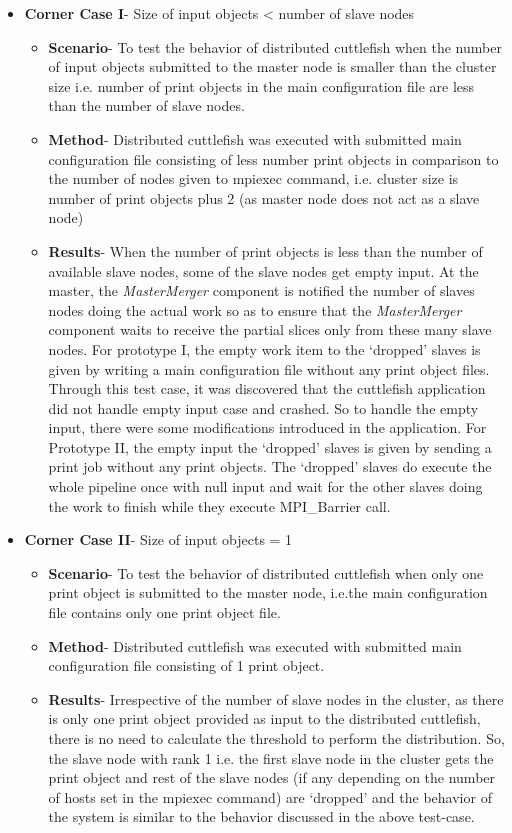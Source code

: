 \begin{enumerate}
\begin{itemize}
\item{\textbf{Corner Case I}- Size of input objects < number of slave nodes }
\begin{itemize}
\item{\textbf{Scenario}}- To test the behavior of distributed cuttlefish when the number of input objects submitted to the master node is smaller than the cluster size i.e. number of print objects in the main configuration file are less than the number of slave nodes.
\item{\textbf{Method}}- Distributed cuttlefish was executed with submitted main configuration file consisting of less number print objects in comparison to the number of nodes given to mpiexec command, i.e.  cluster size is number of print objects plus 2 (as master node does not act as a slave node)
\item{\textbf{Results}}- When the number of print objects is less than the number of available slave nodes, some of the slave nodes get empty input. At the master, the \textit{MasterMerger} component is notified the number of slaves nodes doing the actual work so as to ensure that the \textit{MasterMerger} component waits to receive the partial slices only from these many slave nodes. For prototype I, the empty work item to the {\lq}dropped{\rq} slaves is given by writing a main configuration file without any print object files. Through this test case, it was discovered that the cuttlefish application did not handle empty input case and crashed. So to handle the empty input, there were some modifications introduced in the application. For Prototype II, the empty input the {\lq}dropped{\rq} slaves is given by sending a print job without any print objects. The {\lq}dropped{\rq} slaves do execute the whole pipeline once with null input and wait for the other slaves doing the work to finish while they execute MPI\_Barrier call.     
\end{itemize}
\item{\textbf{Corner Case II}- Size of input objects = 1}
\begin{itemize}
\item{\textbf{Scenario}}- To test the behavior of distributed cuttlefish when only one print object is submitted to the master node, i.e.the main configuration file contains only one print object file.
\item{\textbf{Method}}- Distributed cuttlefish was executed with submitted main configuration file consisting of 1 print object.
\item{\textbf{Results}}- Irrespective of the number of slave nodes in the cluster, as there is only one print object provided as input to the distributed cuttlefish, there is no need to calculate the threshold to perform the distribution. So, the slave node with rank 1 i.e. the first slave node in the cluster gets the print object and rest of the slave nodes (if any depending on the number of hosts set in the mpiexec command) are {\lq}dropped{\rq} and the behavior of the system is similar to the behavior discussed in the above test-case.
\end{itemize}


\end{itemize}
\end{enumerate}

